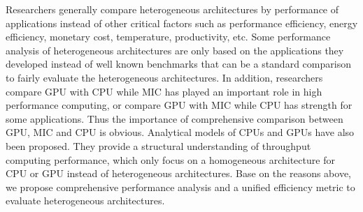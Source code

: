 Researchers generally compare heterogeneous architectures by performance of applications instead of other critical factors such as performance efficiency, energy efficiency, monetary cost, temperature, productivity, etc. Some performance analysis of heterogeneous architectures are only based on the applications they developed instead of well known benchmarks that can be a standard comparison to fairly evaluate the heterogeneous architectures. In addition, researchers compare GPU with CPU while MIC has played an important role in high performance computing, or compare GPU with MIC while CPU has strength for some applications. Thus the importance of comprehensive comparison between GPU, MIC and CPU is obvious. Analytical models of CPUs \cite{R:13} and GPUs \cite{R:14} have also been proposed. They provide a structural understanding of throughput computing performance, which only focus on a homogeneous architecture for CPU or GPU instead of heterogeneous architectures. Base on the reasons above, we propose comprehensive performance analysis and a unified efficiency metric to evaluate heterogeneous architectures.  


